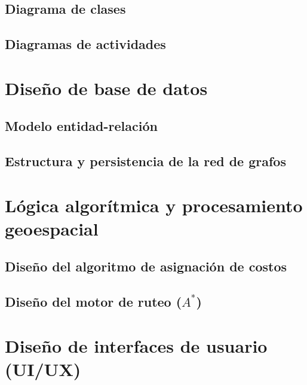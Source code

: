 \subsection{Diagrama de clases}
\subsection{Diagramas de actividades}

\section{Diseño de base de datos}
\subsection{Modelo entidad-relación}
\subsection{Estructura y persistencia de la red de grafos}


\section{Lógica algorítmica y procesamiento geoespacial}
\subsection{Diseño del algoritmo de asignación de costos}
\subsection{Diseño del motor de ruteo (\texorpdfstring{$A^*$}{A*})}

\section{Diseño de interfaces de usuario (UI/UX)}

